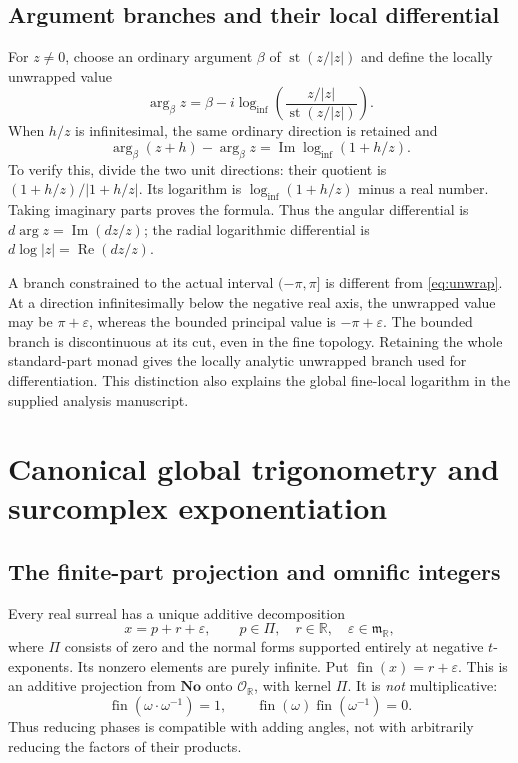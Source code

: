 \documentclass[11pt,letterpaper]{article}
\theoremstyle{definition}
\theoremstyle{remark}
\newcommand{\No}{\mathbf{No}}
\newcommand{\R}{\mathbb R}\newcommand{\C}{\mathbb C}
\newcommand{\OO}{\mathcal O}\newcommand{\mm}{\mathfrak m}
\newcommand{\st}{\operatorname{st}}
\newcommand{\fin}{\operatorname{fin}}
\newcommand{\logi}{\operatorname{log}_{\mathrm{inf}}}
\newcommand{\re}{\operatorname{Re}}\newcommand{\im}{\operatorname{Im}}
\numberwithin{equation}{section}
\begin{document}
\subsection{Argument branches and their local differential}
For $z\ne0$, choose an ordinary argument $\beta$ of $\st(z/|z|)$ and define the locally unwrapped value
\begin{equation}\label{eq:unwrap}
 \arg_{\beta}z=\beta-i\logi\left(\frac{z/|z|}{\st(z/|z|)}\right).
\end{equation}
When $h/z$ is infinitesimal, the same ordinary direction is retained and
\begin{equation}\label{eq:argdifference}
 \arg_{\beta}(z+h)-\arg_{\beta}z=\im\logi(1+h/z).
\end{equation}
To verify this, divide the two unit directions: their quotient is $(1+h/z)/|1+h/z|$. Its logarithm is $\logi(1+h/z)$ minus a real number. Taking imaginary parts proves the formula. Thus the angular differential is $d\arg z=\im(dz/z)$; the radial logarithmic differential is $d\log|z|=\re(dz/z)$.

A branch constrained to the actual interval $(-\pi,\pi]$ is different from \eqref{eq:unwrap}. At a direction infinitesimally below the negative real axis, the unwrapped value may be $\pi+\varepsilon$, whereas the bounded principal value is $-\pi+\varepsilon$. The bounded branch is discontinuous at its cut, even in the fine topology. Retaining the whole standard-part monad gives the locally analytic unwrapped branch used for differentiation. This distinction also explains the global fine-local logarithm in the supplied analysis manuscript.

\section{Canonical global trigonometry and surcomplex exponentiation}\label{sec:global}
\subsection{The finite-part projection and omnific integers}
Every real surreal has a unique additive decomposition
\begin{equation}\label{eq:split}
 x=p+r+\varepsilon,\qquad p\in\Pi,\quad r\in\R,\quad\varepsilon\in\mm_{\R},
\end{equation}
where $\Pi$ consists of zero and the normal forms supported entirely at negative $t$-exponents. Its nonzero elements are purely infinite. Put $\fin(x)=r+\varepsilon$. This is an additive projection from $\No$ onto $\OO_{\R}$, with kernel $\Pi$. It is \emph{not} multiplicative:
\[
 \fin(\omega\cdot\omega^{-1})=1,
 \qquad \fin(\omega)\fin(\omega^{-1})=0.
\]
Thus reducing phases is compatible with adding angles, not with arbitrarily reducing the factors of their products.
\end{document}
